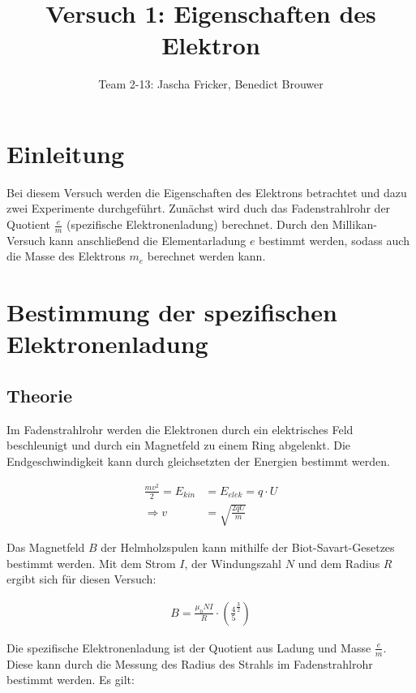 \documentclass[11pt, a4paper]{article}
\title{Versuch 1: Eigenschaften des Elektron}
\author{Team 2-13: Jascha Fricker, Benedict Brouwer}
\begin{document}
    \maketitle


    \tableofcontents

    \newpage

    \section{Einleitung}

    Bei diesem Versuch werden die Eigenschaften des Elektrons betrachtet und dazu zwei Experimente durchgeführt. Zunächst wird duch das Fadenstrahlrohr
    der Quotient $\frac{e}{m}$ (spezifische Elektronenladung) berechnet. Durch den Millikan-Versuch kann anschließend die Elementarladung $e$ bestimmt
    werden, sodass auch die Masse des Elektrons $m_e$ berechnet werden kann.

    \section{Bestimmung der spezifischen Elektronenladung}

    \subsection{Theorie}

    Im Fadenstrahlrohr werden die Elektronen durch ein elektrisches Feld beschleunigt und durch ein Magnetfeld zu einem Ring abgelenkt. Die Endgeschwindigkeit kann durch gleichsetzten der Energien bestimmt werden.

    \begin{align}
    \frac{mv^2}{2} = E_{kin} &= E_{elek} = q \cdot U \label{geschw}\\
    \Rightarrow v &= \sqrt{\frac{2qU}{m}}
    \end{align}
    
    Das Magnetfeld $B$ der Helmholzspulen kann mithilfe der Biot-Savart-Gesetzes bestimmt werden.
    Mit dem Strom $I$, der Windungszahl $N$ und dem Radius $R$ ergibt sich für diesen Versuch:

    \begin{align}
        B = \frac{\mu_0 N I}{R} \cdot \left(\frac{4}{5}^{\frac{3}{2}}\right) \label{B-Helm}
    \end{align}

    Die spezifische Elektronenladung ist der Quotient aus Ladung und Masse $\frac{e}{m}$.
    Diese kann durch die Messung des Radius des Strahls im Fadenstrahlrohr bestimmt werden. Es gilt:
\end{document}
